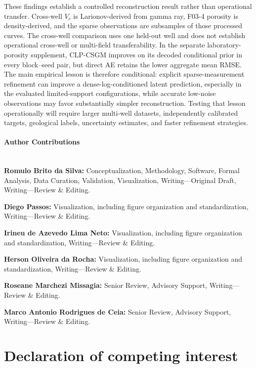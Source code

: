 These findings establish a controlled reconstruction result rather than
operational transfer. Cross-well $V_c$ is Larionov-derived from gamma ray,
F03-4 porosity is density-derived, and the sparse observations are subsamples
of those processed curves. The cross-well comparison uses one held-out well
and does not establish operational cross-well or multi-field transferability.
In the separate laboratory-porosity supplement,
CLP-CSGM improves on its decoded conditional prior in every block--seed pair,
but direct AE retains the lower aggregate mean RMSE. The main empirical
lesson is therefore conditional: explicit sparse-measurement refinement can
improve a dense-log-conditioned latent prediction, especially in the
evaluated limited-support configurations, while accurate low-noise
observations may favor substantially simpler reconstruction. Testing that
lesson operationally will require larger multi-well datasets, independently
calibrated targets, geological labels, uncertainty estimates, and faster
refinement strategies.


\paragraph*{Author Contributions}\mbox{}\\[0.25em]
\noindent
\textbf{Romulo Brito da Silva:} Conceptualization, Methodology, Software, Formal Analysis, Data Curation, Validation, Visualization, Writing---Original Draft, Writing---Review \& Editing.

\noindent
\textbf{Diego Passos:} Visualization, including figure organization and standardization, Writing---Review \& Editing.

\noindent
\textbf{Irineu de Azevedo Lima Neto:} Visualization, including figure organization and standardization, Writing---Review \& Editing.

\noindent
\textbf{Herson Oliveira da Rocha:} Visualization, including figure organization and standardization, Writing---Review \& Editing.

\noindent
\textbf{Roseane Marchezi Missagia:} Senior Review, Advisory Support, Writing---Review \& Editing.

\noindent
\textbf{Marco Antonio Rodrigues de Ceia:} Senior Review, Advisory Support, Writing---Review \& Editing.




\section*{Declaration of competing interest}

